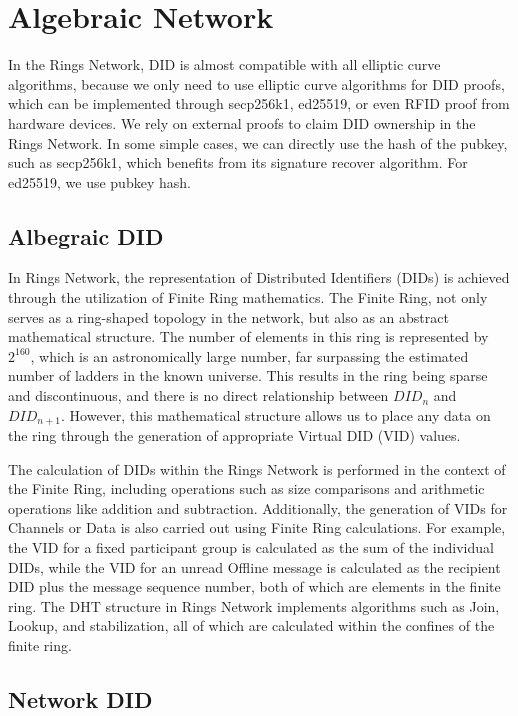 \documentclass[twocolumn]{article}
\begin{document}
\section{Algebraic Network}

In the Rings Network, DID is almost compatible with all elliptic curve algorithms, because we only need to use elliptic curve algorithms for DID proofs, which can be implemented through secp256k1, ed25519, or even RFID proof from hardware devices. We rely on external proofs to claim DID ownership in the Rings Network. In some simple cases, we can directly use the hash of the pubkey, such as secp256k1, which benefits from its signature recover algorithm. For ed25519, we use pubkey hash.

\subsection{Albegraic DID}

In Rings Network, the representation of Distributed Identifiers (DIDs) is achieved through the utilization of Finite Ring mathematics. The Finite Ring, not only serves as a ring-shaped topology in the network, but also as an abstract mathematical structure. The number of elements in this ring is represented by $2^{160}$, which is an astronomically large number, far surpassing the estimated number of ladders in the known universe. This results in the ring being sparse and discontinuous, and there is no direct relationship between $DID_n$ and $DID_{n+1}$. However, this mathematical structure allows us to place any data on the ring through the generation of appropriate Virtual DID (VID) values.

The calculation of DIDs within the Rings Network is performed in the context of the Finite Ring, including operations such as size comparisons and arithmetic operations like addition and subtraction. Additionally, the generation of VIDs for Channels or Data is also carried out using Finite Ring calculations. For example, the VID for a fixed participant group is calculated as the sum of the individual DIDs, while the VID for an unread Offline message is calculated as the recipient DID plus the message sequence number, both of which are elements in the finite ring. The DHT structure in Rings Network implements algorithms such as Join, Lookup, and stabilization, all of which are calculated within the confines of the finite ring.

\subsection{Network DID}
\end{document}
